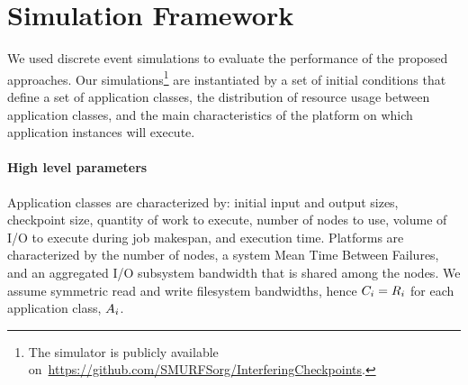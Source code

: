 
\section{Simulation Framework}
\label{sec:simulator}

We used discrete event simulations to evaluate the performance of the proposed
approaches.  Our simulations\footnote{The simulator is publicly
  available on~\url{https://github.com/SMURFSorg/InterferingCheckpoints}.} are
instantiated by a set of initial conditions that define a set of application classes,
the distribution of resource usage between application classes, and the main
characteristics of the platform on which application instances will execute.

\paragraph*{High level parameters}
Application classes are characterized by: initial input and output sizes, checkpoint
size, quantity of work to execute, number of nodes to use, volume of I/O to
execute during job makespan, and execution time.
Platforms are characterized by the number of nodes, a system Mean Time
Between Failures, and an aggregated I/O subsystem bandwidth that is shared among the
nodes. We assume symmetric read and write filesystem bandwidths, hence
$C_{i}=R_{i}$ for each application class, $A_{i}$.

